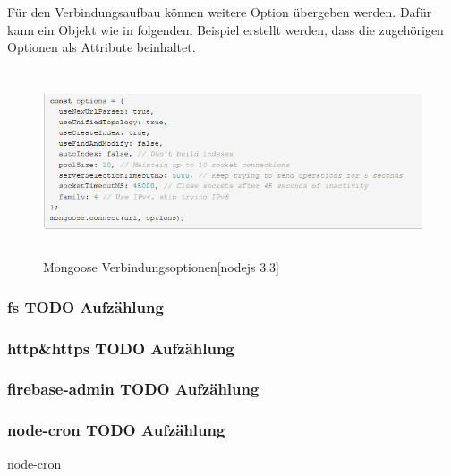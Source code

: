 Für den Verbindungsaufbau können weitere Option übergeben werden. Dafür kann ein Objekt wie in folgendem Beispiel erstellt werden, dass die zugehörigen Optionen als Attribute beinhaltet. 
\newline


\begin{figure}[h]
\centering
\includegraphics[height=5.5cm]{images/nodeJS_mongooseVerbindungOptions.PNG}
\caption{Mongoose Verbindungsoptionen[nodejs 3.3] }
\end{figure}

\newpage
\subsubsection{fs TODO Aufzählung}

\subsubsection{http&https TODO Aufzählung}

\subsubsection{firebase-admin TODO Aufzählung}

\subsubsection{node-cron TODO Aufzählung}

node-cron


